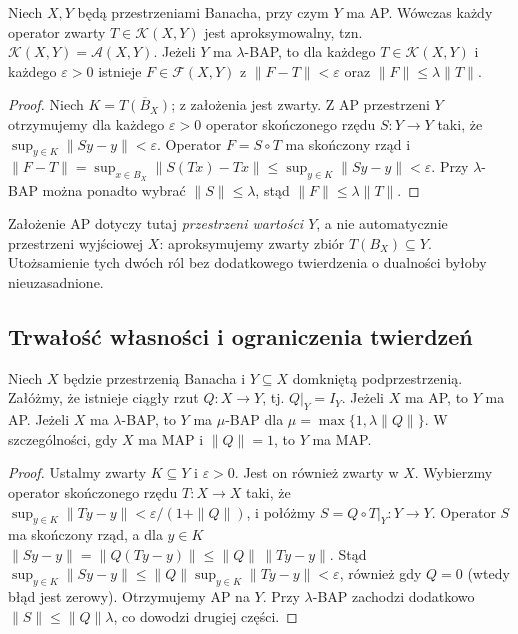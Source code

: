 \begin{twierdzenie}
\label{thm:ap-compact-operators28}
Niech $X,Y$ będą przestrzeniami Banacha, przy czym
$Y$ ma AP. Wówczas każdy operator zwarty
$T\in\mathcal K(X,Y)$ jest aproksymowalny, tzn.
$\mathcal K(X,Y)=\mathcal A(X,Y)$.
Jeżeli $Y$ ma $\lambda$-BAP, to dla każdego
$T\in\mathcal K(X,Y)$ i każdego $\varepsilon>0$
istnieje $F\in\mathcal F(X,Y)$ z
$\|F-T\|<\varepsilon$ oraz $\|F\|\le\lambda\|T\|$.
\end{twierdzenie}
\begin{proof}
Niech $K=\overline{T(B_X)}$; z założenia jest zwarty.
Z AP przestrzeni $Y$ otrzymujemy dla każdego
$\varepsilon>0$ operator skończonego rzędu
$S:Y\to Y$ taki, że
$\sup_{y\in K}\|Sy-y\|<\varepsilon$.
Operator $F=S\circ T$ ma skończony rząd i
$\|F-T\|=\sup_{x\in B_X}\|S(Tx)-Tx\|
\le\sup_{y\in K}\|Sy-y\|<\varepsilon$.
Przy $\lambda$-BAP można ponadto wybrać $\|S\|\le\lambda$,
stąd $\|F\|\le\lambda\|T\|$.
\end{proof}

\begin{uwaga}
\label{rem:range-not-domain28}
Założenie AP dotyczy tutaj \emph{przestrzeni wartości $Y$},
a nie automatycznie przestrzeni wyjściowej $X$:
aproksymujemy zwarty zbiór $T(B_X)\subseteq Y$.
Utożsamienie tych dwóch ról bez dodatkowego twierdzenia
o dualności byłoby nieuzasadnione.
\end{uwaga}

\subsection{Trwałość własności i ograniczenia twierdzeń}

\begin{twierdzenie}
\label{thm:complemented28}
Niech $X$ będzie przestrzenią Banacha i $Y\subseteq X$
domkniętą podprzestrzenią. Załóżmy, że istnieje
ciągły rzut $Q:X\to Y$, tj. $Q|_Y=I_Y$.
Jeżeli $X$ ma AP, to $Y$ ma AP.
Jeżeli $X$ ma $\lambda$-BAP, to $Y$ ma
$\mu$-BAP dla $\mu=\max\{1,\lambda\|Q\|\}$.
W szczególności, gdy $X$ ma MAP i $\|Q\|=1$,
to $Y$ ma MAP.
\end{twierdzenie}
\begin{proof}
Ustalmy zwarty $K\subseteq Y$ i $\varepsilon>0$.
Jest on również zwarty w $X$. Wybierzmy operator skończonego
rzędu $T:X\to X$ taki, że
$\sup_{y\in K}\|Ty-y\|<\varepsilon/(1+\|Q\|)$,
i połóżmy $S=Q\circ T|_Y:Y\to Y$.
Operator $S$ ma skończony rząd, a dla $y\in K$
$\|Sy-y\|=\|Q(Ty-y)\|\le\|Q\|\,\|Ty-y\|$.
Stąd
$\sup_{y\in K}\|Sy-y\|\le
\|Q\|\sup_{y\in K}\|Ty-y\|<\varepsilon$,
również gdy $Q=0$ (wtedy błąd jest zerowy).
Otrzymujemy AP na $Y$.
Przy $\lambda$-BAP zachodzi dodatkowo
$\|S\|\le\|Q\|\lambda$, co dowodzi drugiej części.
\end{proof}

